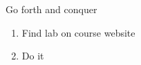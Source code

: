 \documentclass{beamer}
\begin{document}
\begin{frame}{Go forth and conquer}
\begin{enumerate}
\item Find lab on course website
\item Do it
\end{enumerate}
\end{frame}

%
%



\end{document}
